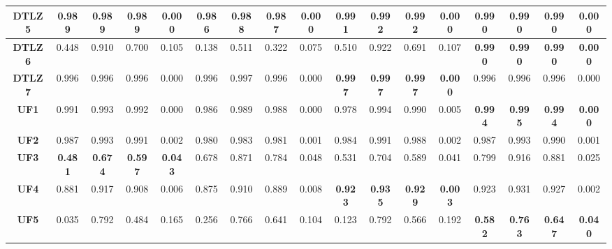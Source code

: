 \begin{table*}[t]
\begin{tabular}{cc|c|c|c|c|c|c|c|c|c|c|c|c|c|c|c}
\multicolumn{1}{c|}{\textbf{DTLZ5}} & 0.989          & 0.989          & 0.989          & 0.000          & 0.986          & 0.988          & 0.987          & 0.000          & \textbf{0.991} & \textbf{0.992} & \textbf{0.992} & \textbf{0.000} & 0.990          & 0.990          & 0.990          & 0.000          \\ \hline
\multicolumn{1}{c|}{\textbf{DTLZ6}} & 0.448          & 0.910          & 0.700          & 0.105          & 0.138          & 0.511          & 0.322          & 0.075          & 0.510          & 0.922          & 0.691          & 0.107          & \textbf{0.990} & \textbf{0.990} & \textbf{0.990} & \textbf{0.000} \\ \hline
\multicolumn{1}{c|}{\textbf{DTLZ7}} & 0.996          & 0.996          & 0.996          & 0.000          & 0.996          & 0.997          & 0.996          & 0.000          & \textbf{0.997} & \textbf{0.997} & \textbf{0.997} & \textbf{0.000} & 0.996          & 0.996          & 0.996          & 0.000          \\ \hline
\multicolumn{1}{c|}{\textbf{UF1}}   & 0.991          & 0.993          & 0.992          & 0.000          & 0.986          & 0.989          & 0.988          & 0.000          & 0.978          & 0.994          & 0.990          & 0.005          & \textbf{0.994} & \textbf{0.995} & \textbf{0.994} & \textbf{0.000} \\ \hline
\multicolumn{1}{c|}{\textbf{UF2}}   & 0.987          & 0.993          & 0.991          & 0.002          & 0.980          & 0.983          & 0.981          & 0.001          & 0.984          & 0.991          & 0.988          & 0.002          & 0.987          & 0.993          & 0.990          & 0.001          \\ \hline
\multicolumn{1}{c|}{\textbf{UF3}}   & \textbf{0.481} & \textbf{0.674} & \textbf{0.597} & \textbf{0.043} & 0.678          & 0.871          & 0.784          & 0.048          & 0.531          & 0.704          & 0.589          & 0.041          & 0.799          & 0.916          & 0.881          & 0.025          \\ \hline
\multicolumn{1}{c|}{\textbf{UF4}}   & 0.881          & 0.917          & 0.908          & 0.006          & 0.875          & 0.910          & 0.889          & 0.008          & \textbf{0.923} & \textbf{0.935} & \textbf{0.929} & \textbf{0.003} & 0.923          & 0.931          & 0.927          & 0.002          \\ \hline
\multicolumn{1}{c|}{\textbf{UF5}}   & 0.035          & 0.792          & 0.484          & 0.165          & 0.256          & 0.766          & 0.641          & 0.104          & 0.123          & 0.792          & 0.566          & 0.192          & \textbf{0.582} & \textbf{0.763} & \textbf{0.647} & \textbf{0.040} \\ \hline

\end{tabular}
\end{table*}
